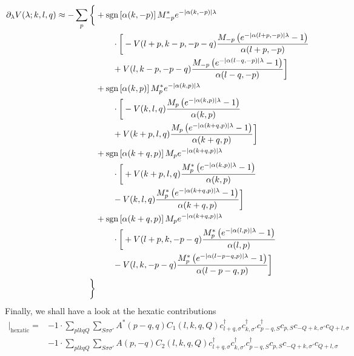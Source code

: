 \begin{align*}
	\partial_{\lambda} V(\lambda; k, l, q) \approx - \sum_{p} \bigg\{ &+\operatorname{sgn} \left[\alpha (k, -p)\right] M_{-p}^* e^{ - | \alpha (k,-p) | \lambda }\\
		&\qquad\cdot\bigg[  - V(l+p, k-p, -p-q) \frac{M_{-p} \left(  e^{ - | \alpha (l+p,-p) | \lambda } - 1 \right) }{\alpha (l+p, -p)}\\
		&\qquad + V(l, k-p, -p-q) \frac{M_{-p} \left(  e^{ - | \alpha (l-q,-p) | \lambda } - 1 \right)}{\alpha (l-q, -p)} \bigg]\\
	&+\operatorname{sgn} \left[\alpha (k, p)\right] M_{p}^* e^{ - | \alpha (k,p) | \lambda }\\
		&\qquad\cdot\bigg[  - V(k, l, q) \frac{M_{p} \left(  e^{ - | \alpha (k,p) | \lambda } - 1 \right) }{\alpha (k, p)}\\
		&\qquad + V(k+p, l, q) \frac{M_{p} \left(  e^{ - | \alpha (k+q,p) | \lambda } - 1 \right)}{\alpha (k+q, p)} \bigg]\\
	&+\operatorname{sgn} \left[\alpha (k+q, p)\right] M_{p} e^{ - | \alpha (k+q,p) | \lambda }\\
		&\qquad\cdot\bigg[  + V(k+p, l, q) \frac{M_{p}^* \left(  e^{ - | \alpha (k,p) | \lambda } - 1 \right)}{\alpha (k, p)}\\
		&\qquad - V(k, l, q) \frac{M_{p}^* \left(  e^{ - | \alpha (k+q,p) | \lambda } - 1 \right)}{\alpha (k+q, p)} \bigg]\\
	&+\operatorname{sgn} \left[\alpha (k+q, p)\right] M_{p} e^{ - | \alpha (k+q,p) | \lambda }\\
		&\qquad\cdot\bigg[  + V(l+p, k, -p-q) \frac{M_{p}^* \left(  e^{ - | \alpha (l,p) | \lambda } - 1 \right)}{\alpha (l, p)}\\
		&\qquad - V(l, k, -p-q) \frac{M_{p}^* \left(  e^{ - | \alpha (l-p-q,p) | \lambda } - 1 \right)}{\alpha (l-p-q, p)} \bigg]\\
	 \bigg\}
\end{align*}
Finally, we shall have a look at the hexatic contributions
\begin{align*}
	[\eta, H'] \vert_\mathrm{hexatic} = 	&-1 \cdot \sum_{ p l k q Q } \sum_{ S \sigma \sigma' } A^*( p-q, q )  C_1( l, k, q, Q )   c_{ l+q, \sigma }^\dagger  c_{ k, \sigma' }^\dagger  c_{ p-q, S }^\dagger  c_{ p, S } c_{ -Q+k, \sigma' } c_{ Q+l, \sigma }  \\
	&-1 \cdot \sum_{ p l k q Q } \sum_{ S \sigma \sigma' } A( p, -q )  C_2( l, k, q, Q )   c_{ l+q, \sigma }^\dagger  c_{ k, \sigma' }^\dagger  c_{ p-q, S }^\dagger  c_{ p, S } c_{ -Q+k, \sigma' } c_{ Q+l, \sigma } 
\end{align*}
